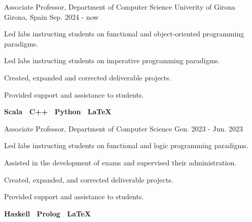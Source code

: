

\begin{cventries}

  \cventry
    {Associate Professor, Department of Computer Science}
    {Univerity of Girona}
    {Girona, Spain}
    {Sep. 2024 - now}
    {
    \begin{cvitems}
    \item {Led labs instructing students on functional and object-oriented programming paradigms.}
    \item {Led labs instructing students on imperative programming paradigms.}
    \item{Created, expanded and corrected deliverable projects.}
    \item{Provided support and assistance to students.}
    \item {
      \textbf{
        Scala \textbar \
        C++ \textbar \
        Python \textbar \
        \LaTeX
      }
    }
    \end{cvitems}
  }
  \cventry
    {Associate Professor, Department of Computer Science}
    {} %
    {} %
    {Gen. 2023 - Jun. 2023} %
    {
    \begin{cvitems}
    \item {Led labs instructing students on functional and logic programming paradigms.}
    \item{Assisted in the development of exams and supervised their administration.}
    \item{Created, expanded, and corrected deliverable projects.}
    \item{Provided support and assistance to students.}
    \item {
      \textbf{
        Haskell \textbar \
        Prolog \textbar \
        \LaTeX
      }
    }
    \end{cvitems}
    \vspace{0.25cm}
 	  }



\end{cventries}
